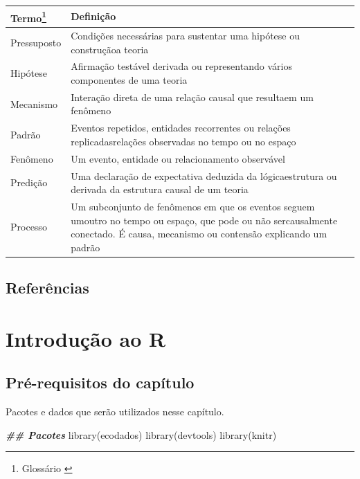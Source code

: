 \documentclass[
]{book}
\newenvironment{Shaded}{\begin{snugshade}}{\end{snugshade}}
\newcommand{\DocumentationTok}[1]{\textcolor[rgb]{0.37,0.37,0.37}{\textbf{\textit{#1}}}}
\newcommand{\FunctionTok}[1]{\textcolor[rgb]{0,0,0}{#1}}
\newcommand{\NormalTok}[1]{#1}
\begin{document}
\begin{longtable}[]{@{}
  >{\raggedright\arraybackslash}p{}
  >{\raggedright\arraybackslash}p{}@{}}
\toprule
Termo\footnote{Glossário \citep[adaptado de][]{pickett_ecological_2007}} & Definição \\
\midrule
\endhead
Pressuposto & Condições necessárias para sustentar uma hipótese ou construçãoa teoria \\
Hipótese & Afirmação testável derivada ou representando vários componentes de uma teoria \\
Mecanismo & Interação direta de uma relação causal que resultaem um fenômeno \\
Padrão & Eventos repetidos, entidades recorrentes ou relações replicadasrelações observadas no tempo ou no espaço \\
Fenômeno & Um evento, entidade ou relacionamento observável \\
Predição & Uma declaração de expectativa deduzida da lógicaestrutura ou derivada da estrutura causal de um teoria \\
Processo & Um subconjunto de fenômenos em que os eventos seguem umoutro no tempo ou espaço, que pode ou não sercausalmente conectado. É causa, mecanismo ou contensão explicando um padrão \\
\bottomrule
\end{longtable}

\hypertarget{referuxeancias}{%
\section{Referências}\label{referuxeancias}}

\hypertarget{cap4}{%
\chapter{Introdução ao R}\label{cap4}}

\hypertarget{pruxe9-requisitos-do-capuxedtulo}{%
\section*{Pré-requisitos do capítulo}\label{pruxe9-requisitos-do-capuxedtulo}}


Pacotes e dados que serão utilizados nesse capítulo.

\begin{Shaded}
\begin{Highlighting}[]
\DocumentationTok{\#\# Pacotes}
\FunctionTok{library}\NormalTok{(ecodados)}
\FunctionTok{library}\NormalTok{(devtools)}
\FunctionTok{library}\NormalTok{(knitr)}
\end{Highlighting}
\end{Shaded}
\end{document}
